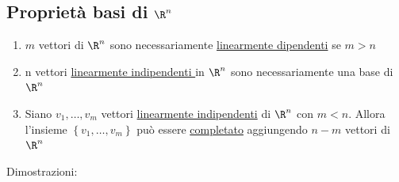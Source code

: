 \documentclass[12pt,a4paper,oneside]{article}
\begin{document}
\subsection{Proprietà basi di $\R^{n}$}
\label{sub::proprietàbasi}
\begin{enumerate}
	\item $m$ vettori di $\R^{n}$ sono necessariamente \underline{linearmente dipendenti} se $m > n$
	\item n vettori \underline{linearmente indipendenti }in $\R^{n}$ sono necessariamente una base di $\R^{n}$
	\item Siano $v_1,\ldots, v_m$ vettori \underline{linearmente indipendenti} di $\R^{n}$ con $m<n$. Allora l'insieme $\left\{ v_1,\ldots,v_m \right\} $ può essere \underline{completato} aggiungendo $n-m$ vettori di $ \R^{n}$
\end{enumerate}
Dimostrazioni:
\end{document}
